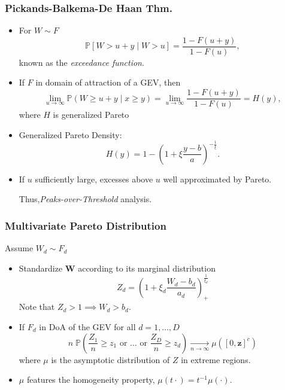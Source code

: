 \documentclass[aspectratio=169,10pt]{beamer}
\begin{document}
\begin{frame}
    \frametitle{Pickands-Balkema-De Haan Thm.}  
    {\small
    \citet{pickands1975,balkema1974}
    \begin{itemize}
    \item For $W\sim F$
    \[
        \mathbb{P}\left[W > u + y\mid W > u\right] 
            = \frac{1 - F(u + y)}{1 - F(u)},
    \]
        known as the \emph{exceedance function}.
    \item If $F$ in domain of attraction of a GEV, then
    \[
        \lim\limits_{u\to\infty}\mathbb{P}\left(W \geq u + y \mid x \geq y\right)
        = \lim\limits_{u\to\infty}\frac{1 - F(u + y)}{1 - F(u)} = H(y),
    \]
        where $H$ is generalized Pareto
    \item Generalized Pareto Density:
    \[
        H(y) = 1 - \left(1 + \xi\frac{y - b}{a}\right)^{-\frac{1}{\xi}}.
    \]
    \item If $u$ sufficiently large, excesses above $u$ well approximated by Pareto.
    
    Thus,\emph{Peaks-over-Threshold} analysis.
    \end{itemize}
    }
\end{frame} %

\begin{frame}
    \frametitle{Multivariate Pareto Distribution}
    Assume $W_d \sim F_d$
    \begin{itemize}
    \item Standardize $\bm{W}$ according to its marginal distribution
    \[
        Z_d = \left(1 + \xi_d\frac{W_d - b_d}{a_d}\right)_+^{\frac{1}{\xi_d}}
    \]
        Note that $Z_d > 1 \implies W_d > b_d$.
    \item If $F_d$ in DoA of the GEV for all $d = 1,\ldots,D$
    \[
    n\;\mathbb{P}\left(
        \frac{Z_1}{n} \geq z_1 \text{ or }\ldots\text{ or }\frac{Z_D}{n} \geq z_d
        \right) \xrightarrow[n\to\infty]{} \mu\left([0,\bm{z}]^c\right)
    \]
    where $\mu$ is the asymptotic distribution of $Z$ in extreme regions.
    \item $\mu$ features the homogeneity property, $\mu(t\cdot) = t^{-1}\mu(\cdot)$.
    \end{itemize}
\end{frame} %
\end{document}
